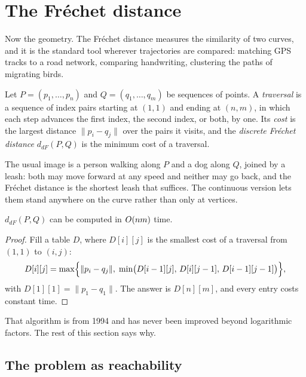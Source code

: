 \section{The Fr\'echet distance}
\label{sec:frechet}

Now the geometry. The Fr\'echet distance measures the similarity of two curves,
and it is the standard tool wherever trajectories are compared: matching GPS
tracks to a road network, comparing handwriting, clustering the paths of
migrating birds.

\begin{definition}\label{def:discrete-frechet}
Let $P = (p_1,\ldots,p_{n})$ and $Q = (q_1,\ldots,q_{m})$ be sequences of
points. A \emph{traversal} is a sequence of index pairs starting at $(1,1)$ and
ending at $(n,m)$, in which each step advances the first index, the second
index, or both, by one. Its \emph{cost} is the largest distance
$\lVert p_i - q_j \rVert$ over the pairs it visits, and the \emph{discrete
Fr\'echet distance} $d_{dF}(P,Q)$ is the minimum cost of a traversal.
\end{definition}

The usual image is a person walking along $P$ and a dog along $Q$, joined by a
leash: both may move forward at any speed and neither may go back, and the
Fr\'echet distance is the shortest leash that suffices. The continuous version
lets them stand anywhere on the curve rather than only at vertices.

\begin{proposition}\label{prop:frechet-dp}
$d_{dF}(P,Q)$ can be computed in $O\!\left(nm\right)$ time.
\end{proposition}

\begin{proof}
Fill a table $D$, where $D[i][j]$ is the smallest cost of a traversal from
$(1,1)$ to $(i,j)$:
\[ D[i][j] = \max\Bigl\{ \lVert p_i - q_j\rVert, \;
   \min\bigl( D[i-1][j],\, D[i][j-1],\, D[i-1][j-1] \bigr) \Bigr\}, \]
with $D[1][1] = \lVert p_1 - q_1 \rVert$. The answer is $D[n][m]$, and every
entry costs constant time.
\end{proof}

That algorithm is from 1994 and has never been improved beyond logarithmic
factors. The rest of this section says why.

\subsection{The problem as reachability}

